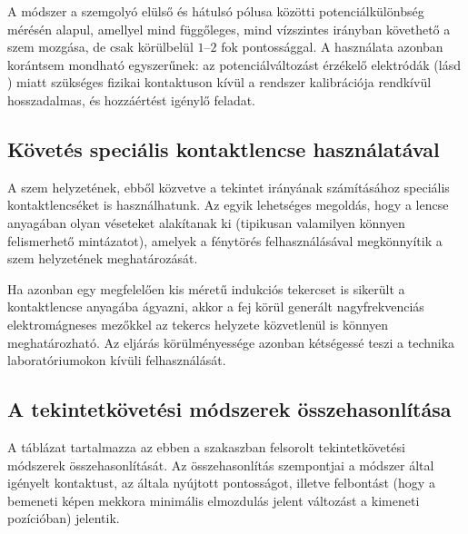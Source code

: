 A módszer a szemgolyó elülső és hátulsó pólusa közötti potenciálkülönbség mérésén alapul, amellyel mind függőleges, mind vízszintes irányban követhető a szem mozgása, de csak körülbelül $1$--$2$ fok pontossággal. A használata azonban korántsem mondható egyszerűnek: az potenciálváltozást érzékelő elektródák (lásd ) miatt szükséges fizikai kontaktuson kívül a rendszer kalibrációja rendkívül hosszadalmas, és hozzáértést igénylő feladat.

\subsection{Követés speciális kontaktlencse használatával}\label{sect:kontakt}

A szem helyzetének, ebből közvetve a tekintet irányának számításához speciális kontaktlencséket is használhatunk. Az egyik lehetséges megoldás, hogy a lencse anyagában olyan véseteket alakítanak ki (tipikusan valamilyen könnyen felismerhető mintázatot), amelyek a fénytörés felhasználásával megkönnyítik a szem helyzetének meghatározását.

Ha azonban egy megfelelően kis méretű indukciós tekercset is sikerült a kontaktlencse anyagába ágyazni, akkor a fej körül generált nagyfrekvenciás elektromágneses mezőkkel az tekercs helyzete közvetlenül is könnyen meghatározható. Az eljárás körülményessége azonban kétségessé teszi a technika laboratóriumokon kívüli felhasználását.


\subsection{A tekintetkövetési módszerek összehasonlítása}\label{sect:tekintet_osszehas}

A  táblázat tartalmazza az ebben a szakaszban felsorolt tekintetkövetési módszerek összehasonlítását. Az összehasonlítás szempontjai a módszer által igényelt kontaktust, az általa nyújtott pontosságot, illetve felbontást (hogy a bemeneti képen mekkora minimális elmozdulás jelent változást a kimeneti pozícióban) jelentik. 

